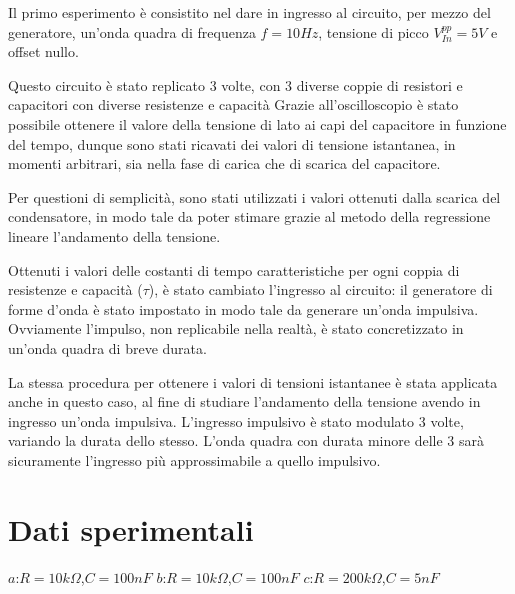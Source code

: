     Il primo esperimento è consistito nel dare in ingresso al circuito, per mezzo del generatore,
    un'onda quadra di frequenza $f = 10Hz$, tensione di picco $V_{In}^{pp} = 5V$ e offset nullo.\par
    Questo circuito è stato replicato 3 volte, con 3 diverse coppie di resistori e capacitori con diverse
    resistenze e capacità
    Grazie all'oscilloscopio è stato possibile ottenere il valore della tensione di lato ai capi 
    del capacitore in funzione del tempo, dunque sono stati ricavati dei valori di tensione istantanea,
    in momenti arbitrari, sia nella fase di carica che di scarica del capacitore.  \par
    Per questioni di semplicità, sono stati utilizzati i valori ottenuti dalla scarica del condensatore, in modo tale
    da poter stimare grazie al metodo della regressione lineare l'andamento della tensione.\par
    Ottenuti i valori delle costanti di tempo caratteristiche per ogni coppia di resistenze e capacità ($\tau$),
    è stato cambiato l'ingresso al circuito: il generatore di forme d'onda è stato impostato in modo tale da generare
    un'onda impulsiva. Ovviamente l'impulso, non replicabile nella realtà, è stato concretizzato in un'onda quadra di breve
    durata. \par
    La stessa procedura per ottenere i valori di tensioni istantanee è stata applicata anche in questo caso,
    al fine di studiare l'andamento della tensione avendo in ingresso un'onda impulsiva.
    L'ingresso impulsivo è stato modulato 3 volte, variando la durata dello stesso.
    L'onda quadra con durata minore delle 3 sarà sicuramente l'ingresso più approssimabile a quello impulsivo. \par
    

    \section{Dati sperimentali}

    $a$:$R = 10k\Omega$,$C = 100nF$
    \hspace{0.90 cm} $b$:$R = 10k\Omega$,$C = 100nF$
    \hspace{0.90 cm} $c$:$R = 200k\Omega$,$C = 5nF$

